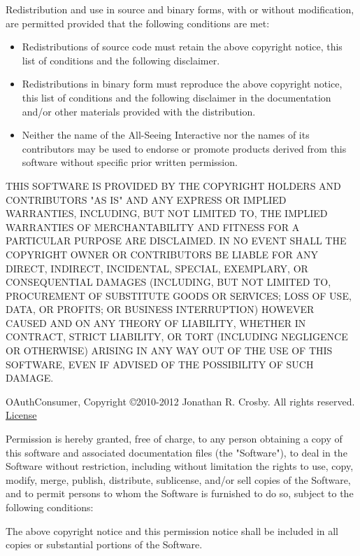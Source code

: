 \documentclass[oneside, openany, 12pt]{tufte-book}
\newcommand{\licensetext}{\scriptsize \setlength{\parskip}{0mm} \singlespacing}
\begin{document}
{\licensetext Redistribution and use in source and binary forms, with or without
modification, are permitted provided that the following conditions are met:

\begin{itemize}

\item Redistributions of source code must retain the above copyright
notice, this list of conditions and the following disclaimer.
       
       
\item Redistributions in binary form must reproduce the above copyright
notice, this list of conditions and the following disclaimer in the
documentation and/or other materials provided with the distribution.

\item Neither the name of the All-Seeing Interactive nor the
names of its contributors may be used to endorse or promote products
derived from this software without specific prior written permission.
\end{itemize}

THIS SOFTWARE IS PROVIDED BY THE COPYRIGHT HOLDERS AND CONTRIBUTORS "AS IS"
AND ANY EXPRESS OR IMPLIED WARRANTIES, INCLUDING, BUT NOT LIMITED TO, THE
IMPLIED WARRANTIES OF MERCHANTABILITY AND FITNESS FOR A PARTICULAR PURPOSE ARE
DISCLAIMED. IN NO EVENT SHALL THE COPYRIGHT OWNER OR CONTRIBUTORS BE LIABLE
FOR ANY DIRECT, INDIRECT, INCIDENTAL, SPECIAL, EXEMPLARY, OR CONSEQUENTIAL
DAMAGES (INCLUDING, BUT NOT LIMITED TO, PROCUREMENT OF SUBSTITUTE GOODS OR
SERVICES; LOSS OF USE, DATA, OR PROFITS; OR BUSINESS INTERRUPTION) HOWEVER
CAUSED AND ON ANY THEORY OF LIABILITY, WHETHER IN CONTRACT, STRICT LIABILITY,
OR TORT (INCLUDING NEGLIGENCE OR OTHERWISE) ARISING IN ANY WAY OUT OF THE USE
OF THIS SOFTWARE, EVEN IF ADVISED OF THE POSSIBILITY OF SUCH DAMAGE.}

OAuthConsumer, Copyright \copyright 2010-2012 Jonathan R. Crosby. All rights reserved. \href{http://www.opensource.org/licenses/mit-license.php}{License}

{\licensetext Permission is hereby granted, free of charge, to any person obtaining a copy of this software and associated documentation files (the "Software"), to deal in the Software without restriction, including without limitation the rights to use, copy, modify, merge, publish, distribute, sublicense, and/or sell copies of the Software, and to permit persons to whom the Software is furnished to do so, subject to the following conditions:

The above copyright notice and this permission notice shall be included in all copies or substantial portions of the Software.}
\end{document}
